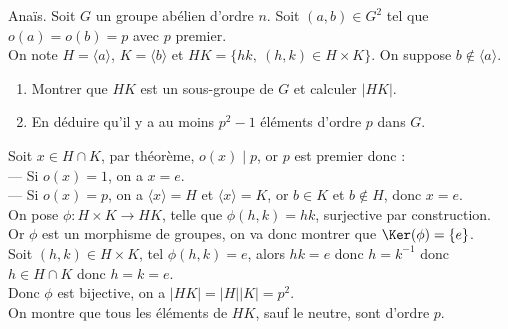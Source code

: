 \documentclass[11pt]{article}
\begin{document}
\begin{exercice}{Anaïs.}{}
    Soit $G$ un groupe abélien d'ordre $n$. Soit $(a,b)\in G^2$ tel que $o(a)=o(b)=p$ avec $p$ premier.\\
    On note $H=\langle a\rangle$, $K=\langle b\rangle$ et $HK=\{hk, ~ (h,k) \in H\times K\}$. On suppose $b\notin\langle a\rangle$.
    \begin{enumerate}
        \item Montrer que $HK$ est un sous-groupe de $G$ et calculer $|HK|$.
        \item En déduire qu'il y a au moins $p^2-1$ éléments d'ordre $p$ dans $G$.
    \end{enumerate}
    \tcblower
     Soit $x\in H\cap K$, par théorème, $o(x)\mid p$, or $p$ est premier donc :\\
    --- Si $o(x)=1$, on a $x=e$.\\
    --- Si $o(x)=p$, on a $\langle x \rangle = H$ et $\langle x \rangle = K$, or $b\in K$ et $b\notin H$, donc $x=e$.\\
    On pose $\phi:H\times K \to HK$, telle que $\phi(h,k)=hk$, surjective par construction.\\
    Or $\phi$ est un morphisme de groupes, on va donc montrer que $\Ker(\phi)=\{e\}$.\\
    Soit $(h,k)\in H\times K$, tel $\phi(h,k)=e$, alors $hk=e$ donc $h=k^{-1}$ donc $h\in H\cap K$ donc $h=k=e$.\\
    Donc $\phi$ est bijective, on a $|HK|=|H||K|=p^2$.\\
     On montre que tous les éléments de $HK$, sauf le neutre, sont d'ordre $p$.
\end{exercice}

\vspace*{-0.8cm}
\end{document}
